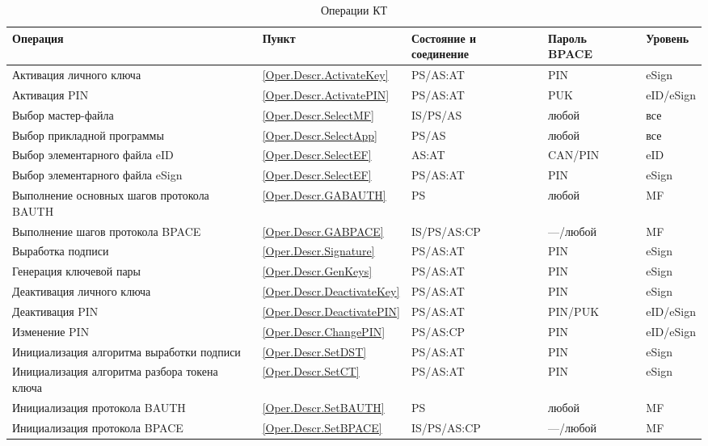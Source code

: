 \begin{table}[p]
\caption{Операции КТ}
\label{Table.Oper.List}
\begin{tabular}{|p{7.5cm}|p{1.3cm}|p{2.6cm}|p{1.8cm}| p{1.7cm}|}
\hline
Операция & Пункт & Состояние и соединение & Пароль BPACE & Уровень \\
\hline
\hline
%
Активация личного ключа & \ref{Oper.Descr.ActivateKey} & PS/AS:AT & PIN & eSign \\
\hline
%
Активация PIN & \ref{Oper.Descr.ActivatePIN} & PS/AS:AT & PUK & eID/eSign \\
\hline
%
Выбор мастер-файла & \ref{Oper.Descr.SelectMF} & IS/PS/AS & любой & все \\
\hline
%
Выбор прикладной программы & \ref{Oper.Descr.SelectApp} & PS/AS & любой & все \\
\hline
%
Выбор элементарного файла eID & \ref{Oper.Descr.SelectEF} & AS:AT & CAN/PIN & eID \\
\hline
%
Выбор элементарного файла eSign & \ref{Oper.Descr.SelectEF} & PS/AS:AT & PIN & eSign \\
\hline
%
Выполнение основных шагов протокола BAUTH & \ref{Oper.Descr.GABAUTH} & PS & любой & MF \\
\hline
%
Выполнение шагов протокола BPACE & \ref{Oper.Descr.GABPACE} & IS/PS/AS:CP & ---/любой & MF \\
\hline
%
Выработка подписи & \ref{Oper.Descr.Signature} & PS/AS:AT & PIN & eSign \\
\hline
%
Генерация ключевой пары & \ref{Oper.Descr.GenKeys} & PS/AS:AT & PIN & eSign \\
\hline
%
Деактивация личного ключа & \ref{Oper.Descr.DeactivateKey}  & PS/AS:AT & PIN & eSign \\
\hline
%
Деактивация PIN & \ref{Oper.Descr.DeactivatePIN}  & PS/AS:AT & PIN/PUK & eID/eSign \\
\hline
%
Изменение PIN & \ref{Oper.Descr.ChangePIN} & PS/AS:CP & PIN & eID/eSign \\
\hline
%
Инициализация алгоритма выработки подписи & \ref{Oper.Descr.SetDST} & PS/AS:AT & PIN & eSign \\
\hline
%
Инициализация алгоритма разбора токена ключа & \ref{Oper.Descr.SetCT} & PS/AS:AT & PIN & eSign \\
\hline
%
Инициализация протокола BAUTH & \ref{Oper.Descr.SetBAUTH} & PS & любой & MF \\
\hline
%
Инициализация протокола BPACE & \ref{Oper.Descr.SetBPACE} & IS/PS/AS:CP & ---/любой & MF \\

\end{tabular}
\end{table}
